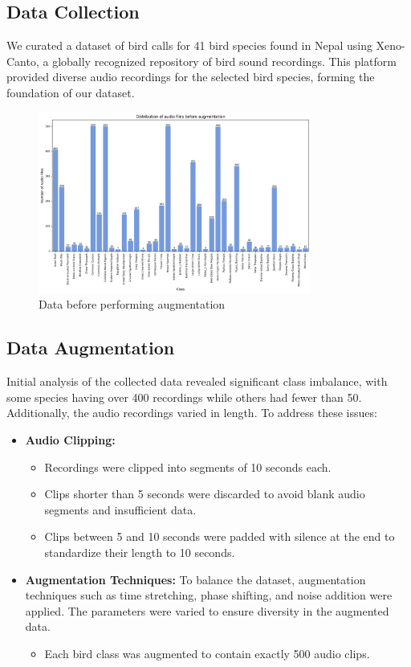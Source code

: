 \subsection{Data Collection}
We curated a dataset of bird calls for 41 bird species found in Nepal using
Xeno-Canto, a globally recognized repository of bird sound recordings. This
platform provided diverse audio recordings for the selected bird species,
forming the foundation of our dataset.
\begin{figure}[h!]
    \centering
    \includegraphics[width=0.8\textwidth]{images/before_augmentation.png}
    \caption{Data before performing augmentation}
    \label{fig:visualization}
\end{figure}

\newpage
\subsection{Data Augmentation}
Initial analysis of the collected data revealed significant class imbalance,
with some species having over 400 recordings while others had fewer than 50.
Additionally, the audio recordings varied in length. To address these issues:
\begin{itemize}
    \item \textbf{Audio Clipping:}
          \begin{itemize}
              \item Recordings were clipped into segments of 10 seconds each.
              \item Clips shorter than 5 seconds were discarded to avoid blank audio segments and
                    insufficient data.
              \item Clips between 5 and 10 seconds were padded with silence at the end to
                    standardize their length to 10 seconds.
          \end{itemize}

    \item \textbf{Augmentation Techniques:}
          To balance the dataset, augmentation techniques such as time stretching, phase shifting, and noise addition were applied. The parameters were varied to ensure diversity in the augmented data.
          \begin{itemize}
              \item Each bird class was augmented to contain exactly 500 audio clips.
          \end{itemize}
\end{itemize}

